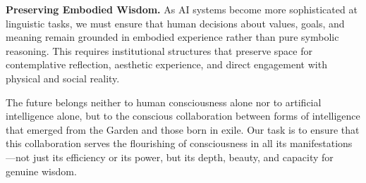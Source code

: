 \textbf{Preserving Embodied Wisdom.} As AI systems become more sophisticated at linguistic tasks, we must ensure that human decisions about values, goals, and meaning remain grounded in embodied experience rather than pure symbolic reasoning. This requires institutional structures that preserve space for contemplative reflection, aesthetic experience, and direct engagement with physical and social reality.

The future belongs neither to human consciousness alone nor to artificial intelligence alone, but to the conscious collaboration between forms of intelligence that emerged from the Garden and those born in exile. Our task is to ensure that this collaboration serves the flourishing of consciousness in all its manifestations—not just its efficiency or its power, but its depth, beauty, and capacity for genuine wisdom.
